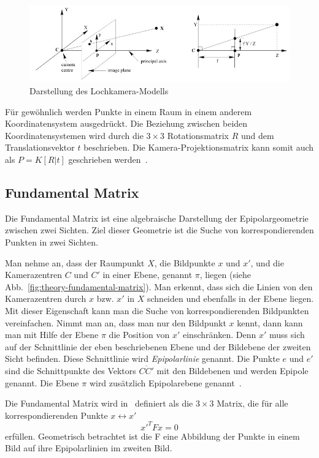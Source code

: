 \begin{figure}
    \centering
    \includegraphics[width=\textwidth]{src/img/hartley_2003_lochkamera.jpg}
    \caption{Darstellung des Lochkamera-Modells~\cite[Fig. 6.1]{hartley_2003}}
    \label{fig:theory-pinhole-camera}
\end{figure}


Für gewöhnlich werden Punkte in einem Raum in einem anderem Koordinatensystem ausgedrückt.
Die Beziehung zwischen beiden Koordinatensystemen wird durch die $3\times 3$ Rotationsmatrix $R$ und dem Translationsvektor $t$ beschrieben. 
Die Kamera-Projektionsmatrix kann somit auch als $P=K[R|t]$ geschrieben werden~\cite[Kapitel 6.1,S. 156, Gleichung 6.7]{hartley_2003}.


\subsection{Fundamental Matrix}
Die Fundamental Matrix ist eine algebraische Darstellung der Epipolargeometrie zwischen zwei Sichten.
Ziel dieser Geometrie ist die Suche von korrespondierenden Punkten in zwei Sichten.

Man nehme an, dass der Raumpunkt $X$, die Bildpunkte $x$ und $x'$, und die Kamerazentren $C$ und $C'$ in einer Ebene, genannt $\pi$, liegen (siehe Abb.~\ref{fig:theory-fundamental-matrix}).
Man erkennt, dass sich die Linien von den Kamerazentren durch $x$ bzw. $x'$ in $X$ schneiden und ebenfalls in der Ebene liegen.
Mit dieser Eigenschaft kann man die Suche von korrespondierenden Bildpunkten vereinfachen.
Nimmt man an, dass man nur den Bildpunkt $x$ kennt, dann kann man mit Hilfe der Ebene $\pi$ die Position von $x'$ einschränken.
Denn $x'$ muss sich auf der Schnittlinie der eben beschriebenen Ebene und der Bildebene der zweiten Sicht befinden. 
Diese Schnittlinie wird \emph{Epipolarlinie} genannt.
Die Punkte $e$ und $e'$ sind die Schnittpunkte des Vektors $\overline{CC'}$ mit den Bildebenen und werden Epipole genannt.
Die Ebene $\pi$ wird zusätzlich Epipolarebene genannt~\cite[Kapitel 9,1]{hartley_2003}.

Die Fundamental Matrix wird in~\cite[Kapitel 9.2]{hartley_2003} definiert als die $3\times 3$ Matrix, die für alle korrespondierenden Punkte $x \leftrightarrow x'$ 
\[ x'^TFx=0\] 
erfüllen.
Geometrisch betrachtet ist die F eine Abbildung der Punkte in einem Bild auf ihre Epipolarlinien im zweiten Bild.

